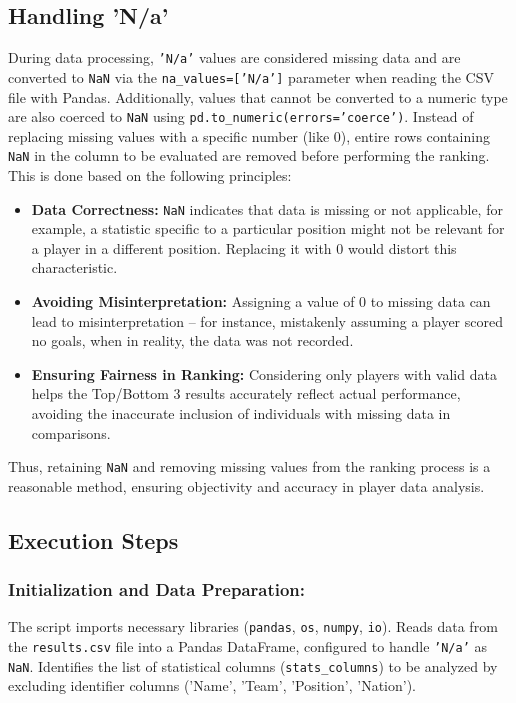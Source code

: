\documentclass[12pt, a4paper]{report}
\begin{document}
\subsection{Handling 'N/a'}
During data processing, \texttt{'N/a'} values are considered missing data and are converted to \texttt{NaN} via the \texttt{na\_values=['N/a']} parameter when reading the CSV file with Pandas.
Additionally, values that cannot be converted to a numeric type are also coerced to \texttt{NaN} using \texttt{pd.to\_numeric(errors='coerce')}.
Instead of replacing missing values with a specific number (like 0), entire rows containing \texttt{NaN} in the column to be evaluated are removed before performing the ranking.
This is done based on the following principles:
\begin{itemize}
    \item \textbf{Data Correctness:} \texttt{NaN} indicates that data is missing or not applicable, for example, a statistic specific to a particular position might not be relevant for a player in a different position. Replacing it with 0 would distort this characteristic.
    \item \textbf{Avoiding Misinterpretation:} Assigning a value of 0 to missing data can lead to misinterpretation – for instance, mistakenly assuming a player scored no goals, when in reality, the data was not recorded.
    \item \textbf{Ensuring Fairness in Ranking:} Considering only players with valid data helps the Top/Bottom 3 results accurately reflect actual performance, avoiding the inaccurate inclusion of individuals with missing data in comparisons.
\end{itemize}
Thus, retaining \texttt{NaN} and removing missing values from the ranking process is a reasonable method, ensuring objectivity and accuracy in player data analysis.

\subsection{Execution Steps}
\subsubsection*{Initialization and Data Preparation:}
The script imports necessary libraries (\texttt{pandas}, \texttt{os}, \texttt{numpy}, \texttt{io}).
Reads data from the \texttt{results.csv} file into a Pandas DataFrame, configured to handle \texttt{'N/a'} as \texttt{NaN}.
Identifies the list of statistical columns (\texttt{stats\_columns}) to be analyzed by excluding identifier columns ('Name', 'Team', 'Position', 'Nation').
\end{document}

